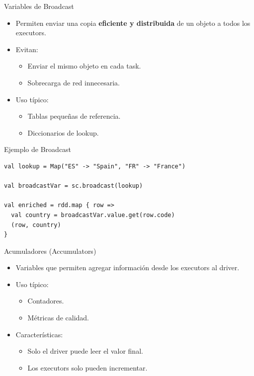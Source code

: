 \documentclass{beamer}
\begin{document}
\begin{frame}{Variables de Broadcast}
\begin{itemize}
  \item Permiten enviar una copia \textbf{eficiente y distribuida} de un objeto a todos los executors.
  \item Evitan:
  \begin{itemize}
    \item Enviar el mismo objeto en cada task.
    \item Sobrecarga de red innecesaria.
  \end{itemize}
  \item Uso típico:
  \begin{itemize}
    \item Tablas pequeñas de referencia.
    \item Diccionarios de lookup.
  \end{itemize}
\end{itemize}
\end{frame}

\begin{frame}[fragile]{Ejemplo de Broadcast}
\begin{verbatim}
val lookup = Map("ES" -> "Spain", "FR" -> "France")

val broadcastVar = sc.broadcast(lookup)

val enriched = rdd.map { row =>
  val country = broadcastVar.value.get(row.code)
  (row, country)
}
\end{verbatim}
\end{frame}

\begin{frame}{Acumuladores (Accumulators)}
\begin{itemize}
  \item Variables que permiten agregar información desde los executors al driver.
  \item Uso típico:
  \begin{itemize}
    \item Contadores.
    \item Métricas de calidad.
  \end{itemize}
  \item Características:
  \begin{itemize}
    \item Solo el driver puede leer el valor final.
    \item Los executors solo pueden incrementar.
  \end{itemize}
\end{itemize}
\end{frame}
\end{document}
